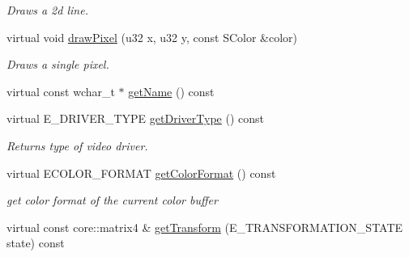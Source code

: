 \begin{DoxyCompactItemize}
\begin{DoxyCompactList}\small\item\em Draws a 2d line. \end{DoxyCompactList}\item 
\hypertarget{classirr_1_1video_1_1_c_burning_video_driver_aab794978ed3e95f0bd1f729d39a6afec}{virtual void \hyperlink{classirr_1_1video_1_1_c_burning_video_driver_aab794978ed3e95f0bd1f729d39a6afec}{draw\-Pixel} (u32 x, u32 y, const S\-Color \&color)}\label{classirr_1_1video_1_1_c_burning_video_driver_aab794978ed3e95f0bd1f729d39a6afec}

\begin{DoxyCompactList}\small\item\em Draws a single pixel. \end{DoxyCompactList}\item 
virtual const wchar\-\_\-t $\ast$ \hyperlink{classirr_1_1video_1_1_c_burning_video_driver_adb0ec0818ad132efb57c68e13d44a431}{get\-Name} () const 
\item 
\hypertarget{classirr_1_1video_1_1_c_burning_video_driver_a8ba49b4b3ce12dbaf12b9374324d70a5}{virtual E\-\_\-\-D\-R\-I\-V\-E\-R\-\_\-\-T\-Y\-P\-E \hyperlink{classirr_1_1video_1_1_c_burning_video_driver_a8ba49b4b3ce12dbaf12b9374324d70a5}{get\-Driver\-Type} () const }\label{classirr_1_1video_1_1_c_burning_video_driver_a8ba49b4b3ce12dbaf12b9374324d70a5}

\begin{DoxyCompactList}\small\item\em Returns type of video driver. \end{DoxyCompactList}\item 
\hypertarget{classirr_1_1video_1_1_c_burning_video_driver_a721d840d6bb6fdc7c4e93fe1a35d5fe8}{virtual E\-C\-O\-L\-O\-R\-\_\-\-F\-O\-R\-M\-A\-T \hyperlink{classirr_1_1video_1_1_c_burning_video_driver_a721d840d6bb6fdc7c4e93fe1a35d5fe8}{get\-Color\-Format} () const }\label{classirr_1_1video_1_1_c_burning_video_driver_a721d840d6bb6fdc7c4e93fe1a35d5fe8}

\begin{DoxyCompactList}\small\item\em get color format of the current color buffer \end{DoxyCompactList}\item 
\hypertarget{classirr_1_1video_1_1_c_burning_video_driver_a5a564dff20a0af8f213904c586b6cc75}{virtual const core\-::matrix4 \& \hyperlink{classirr_1_1video_1_1_c_burning_video_driver_a5a564dff20a0af8f213904c586b6cc75}{get\-Transform} (E\-\_\-\-T\-R\-A\-N\-S\-F\-O\-R\-M\-A\-T\-I\-O\-N\-\_\-\-S\-T\-A\-T\-E state) const }\label{classirr_1_1video_1_1_c_burning_video_driver_a5a564dff20a0af8f213904c586b6cc75}


\end{DoxyCompactItemize}
